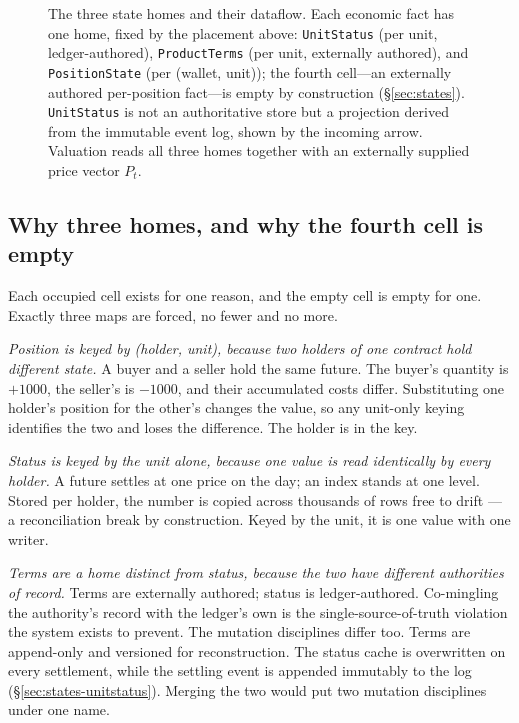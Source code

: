 \begin{figure}[tb]
\caption{The three state homes and their dataflow. Each economic fact has one home, fixed by
the placement above: \texttt{UnitStatus} (per unit, ledger-authored), \texttt{ProductTerms}
(per unit, externally authored), and \texttt{PositionState} (per (wallet, unit)); the fourth
cell---an externally authored per-position fact---is empty by construction (\S\ref{sec:states}).
\texttt{UnitStatus} is not an authoritative store but a projection derived from the immutable
event log, shown by the incoming arrow. Valuation reads all three homes together with an
externally supplied price vector $P_t$.}
\label{fig:threehome}
\end{figure}


\subsection{Why three homes, and why the fourth cell is empty}
\label{sec:states-three}

Each occupied cell exists for one reason, and the empty cell is empty for one. Exactly
three maps are forced, no fewer and no more.

\emph{Position is keyed by (holder, unit), because two holders of one contract hold
different state.} A buyer and a seller hold the same future. The buyer's quantity is
$+1000$, the seller's is $-1000$, and their accumulated costs differ. Substituting one
holder's position for the other's changes the value, so any unit-only keying identifies
the two and loses the difference. The holder is in the key.

\emph{Status is keyed by the unit alone, because one value is read identically by every
holder.} A future settles at one price on the day; an index stands at one level. Stored
per holder, the number is copied across thousands of rows free to drift --- a
reconciliation break by construction. Keyed by the unit, it is one value with one writer.

\emph{Terms are a home distinct from status, because the two have different authorities of
record.} Terms are externally authored; status is ledger-authored. Co-mingling the
authority's record with the ledger's own is the single-source-of-truth violation the
system exists to prevent. The mutation disciplines differ too. Terms are append-only and
versioned for reconstruction. The status cache is overwritten on every settlement, while
the settling event is appended immutably to the log (\S\ref{sec:states-unitstatus}).
Merging the two would put two mutation disciplines under one name.

